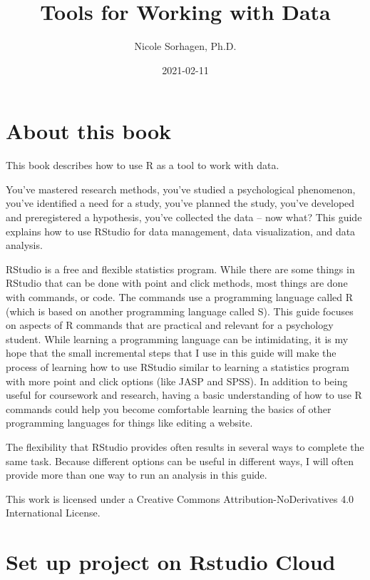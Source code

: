 \documentclass[
]{book}
\title{Tools for Working with Data}
\author{Nicole Sorhagen, Ph.D.}
\date{2021-02-11}
\begin{document}
\maketitle

{
\setcounter{tocdepth}{1}
\tableofcontents
}
\hypertarget{about-this-book}{%
\chapter{About this book}\label{about-this-book}}

This book describes how to use R as a tool to work with data.

You've mastered research methods, you've studied a psychological phenomenon, you've identified a need for a study, you've planned the study, you've developed and preregistered a hypothesis, you've collected the data -- now what? This guide explains how to use RStudio for data management, data visualization, and data analysis.

RStudio is a free and flexible statistics program. While there are some things in RStudio that can be done with point and click methods, most things are done with commands, or code. The commands use a programming language called R (which is based on another programming language called S). This guide focuses on aspects of R commands that are practical and relevant for a psychology student. While learning a programming language can be intimidating, it is my hope that the small incremental steps that I use in this guide will make the process of learning how to use RStudio similar to learning a statistics program with more point and click options (like JASP and SPSS). In addition to being useful for coursework and research, having a basic understanding of how to use R commands could help you become comfortable learning the basics of other programming languages for things like editing a website.

The flexibility that RStudio provides often results in several ways to complete the same task. Because different options can be useful in different ways, I will often provide more than one way to run an analysis in this guide.

This work is licensed under a Creative Commons Attribution-NoDerivatives 4.0 International License.

\hypertarget{set-up-project-on-rstudio-cloud}{%
\chapter{Set up project on Rstudio Cloud}\label{set-up-project-on-rstudio-cloud}}
\end{document}
